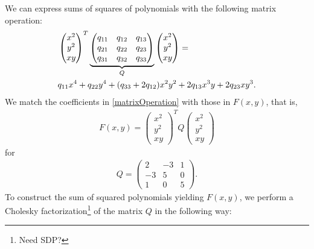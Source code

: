 \documentclass[a4paper,twoside,justified]{tufte-handout}
\begin{document}
We can express sums of squares of polynomials with the following matrix operation:
\begin{align}
\label{matrixOperation}
&\begin{pmatrix}
x^2\\
y^2\\
xy
\end{pmatrix}^T
\underbrace{
\begin{pmatrix}
q_{11} & q_{12} & q_{13}\\
q_{21} & q_{22} & q_{23}\\
q_{31} & q_{32} & q_{33}
\end{pmatrix}
}_Q
\begin{pmatrix}
x^2\\
y^2\\
xy
\end{pmatrix}
=\notag\\
&q_{11}x^4+q_{22}y^4+(q_{33}+2q_{12})x^2y^2+2q_{13}x^3y+2q_{23}xy^3.
\end{align}
We match the coefficients in \eqref{matrixOperation} with those in $F(x,y)$, that is,
\begin{eqnarray*}
F(x,y)=\begin{pmatrix}
x^2\\
y^2\\
xy
\end{pmatrix}^T
Q
\begin{pmatrix}
x^2\\
y^2\\
xy
\end{pmatrix}
\end{eqnarray*}
for
\begin{eqnarray*}
Q=
\begin{pmatrix}
2 & -3 & 1\\
-3 & 5 & 0\\
1 & 0 & 5
\end{pmatrix}.
\end{eqnarray*}
To construct the sum of squared polynomials yielding $F(x,y)$, we perform a Cholesky factorization\footnote{Need SDP?} of the matrix $Q$ in the following way:
\end{document}
